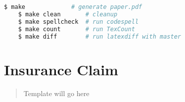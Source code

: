 \documentclass[]{article}
\begin{document}
\begin{center}
	\begin{lstlisting}[language=Bash,morekeywords={make}]
	$ make             # generate paper.pdf
	$ make clean       # cleanup
	$ make spellcheck  # run codespell
	$ make count       # run TexCount
	$ make diff        # run latexdiff with master
	\end{lstlisting}
\end{center}


\section{Insurance Claim}

\begin{quote}
	Template will go here
\end{quote}
\end{document}

